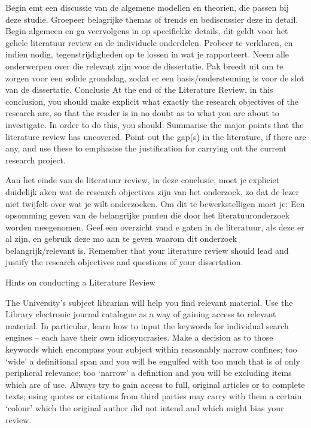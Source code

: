 			Begin emt een discussie van de algemene modellen en theorien, die passen bij deze studie. Groepeer belagrijke themas of trends en bediscussier deze in detail. Begin algemeen en ga veervolgens in op specifiekke details, dit geldt voor het gehele literatuur review en de individuele onderdelen.
			Probeer te verklaren, en indien nodig, tegenstrijdigheden  op te lossen in wat je rapporteert. Neem alle onderwerpen over die relevant zijn voor de dissertatie.
			Pak breedt uit om te zorgen voor een solide grondslag, zodat er een basis/ondersteuning is voor de slot van de dissertatie.
			Conclusie
			At the end of the Literature Review, in this conclusion, you should make explicit what exactly the research objectives of the research are, so that the reader is in no doubt as to what you are about to investigate.
			In order to do this, you should:
			Summarise the major points that the literature review has uncovered.
			Point out the gap(s) in the literature, if there are any, and use these to emphasise the justification for carrying out the current research project.
			
			Aan het einde van de literatuur review, in deze conclusie, moet je expliciet duidelijk aken wat de research objectives zijn  van het onderzoek, zo dat de lezer niet twijfelt over wat je wilt onderzoeken.
			Om dit te bewerkstelligen moet je:
			Een opsomming geven van de belangrijke punten die door het literatuuronderzoek worden meegenomen.
			Geef een overzicht vand e gaten in de literatuur, als deze er al zijn, en gebruik deze mo aan te geven waarom dit onderzoek belangrijk/relevant is.
			Remember  that  your  literature  review  should  lead  and  justify  the research objectives and questions of your dissertation.
			
			Hints on conducting a Literature Review
			
			The University’s subject librarian will help you find relevant material.
			Use the Library electronic journal catalogue as a way of gaining access to relevant material. In particular, learn how to input the keywords for individual search engines – each have their own idiosyncrasies.
			Make a decision as to those keywords which encompass your subject within reasonably narrow confines; too ‘wide’ a definitional span and you will be engulfed with too much that is of only peripheral relevance; too ‘narrow’ a definition and you will be excluding items which are of use.
			Always try to gain access to full, original articles or to complete texts; using quotes or citations from third parties may carry with them a certain ‘colour’ which the original author did not intend and which might bias your review.
			
